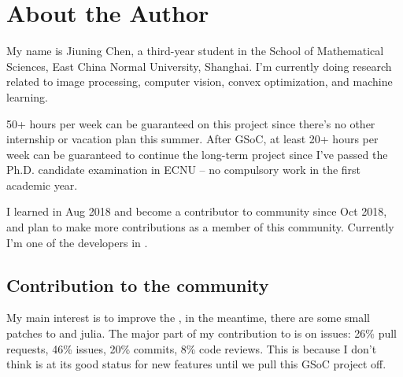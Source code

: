 
\section{About the Author}\label{sec:about_author}

My name is \textsf{Jiuning Chen}, a third-year student in the School of Mathematical Sciences, East China Normal University, Shanghai. I'm currently doing research related to image processing, computer vision, convex optimization, and machine learning. \par

50+ hours per week can be guaranteed on this project since there's no other internship or vacation plan this summer. After GSoC, at least 20+ hours per week can be guaranteed to continue the long-term \images{}  project since I've passed the Ph.D. candidate examination in ECNU -- no compulsory work in the first academic year. \par

I learned \langjulia in Aug 2018 and become a contributor to \langjulia community since Oct 2018, and plan to make more contributions as a member of this community. Currently I'm one of the developers in \repoimagesgithubio{}.

\subsection*{Contribution to the community}
My main interest is to improve the \images, in the meantime, there are some small patches to \flux{} and \textsf{julia}. The major part of my contribution to \textsf{\juliaimages} is on issues: 26\% pull requests, 46\% issues, 20\% commits, 8\% code reviews. This is because I don't think \images{} is at its good status for new features until we pull this GSoC project off.

